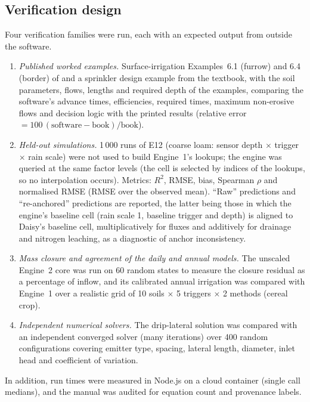 \documentclass[preprint,12pt]{elsarticle}
\begin{document}
\subsection{Verification design}
\label{sec:vermethods}
Four verification families were run, each with an expected output from outside the software.
\begin{enumerate}[nosep]
\item \emph{Published worked examples.} Surface-irrigation Examples~6.1 (furrow) and 6.4 (border) of \cite{Walker1987} and a sprinkler design example from the textbook, with the soil parameters, flows, lengths and required depth of the examples, comparing the software's advance times, efficiencies, required times, maximum non-erosive flows and decision logic with the printed results (relative error $=100\,(\mathrm{software}-\mathrm{book})/\mathrm{book}$).
\item \emph{Held-out simulations.} 1\,000 runs of E12 (coarse loam: sensor depth $\times$ trigger $\times$ rain scale) were not used to build Engine~1's lookups; the engine was queried at the same factor levels (the cell is selected by indices of the lookups, so no interpolation occurs). Metrics: $R^2$, RMSE, bias, Spearman $\rho$ and normalised RMSE (RMSE over the observed mean). ``Raw'' predictions and ``re-anchored'' predictions are reported, the latter being those in which the engine's baseline cell (rain scale 1, baseline trigger and depth) is aligned to Daisy's baseline cell, multiplicatively for fluxes and additively for drainage and nitrogen leaching, as a diagnostic of anchor inconsistency.
\item \emph{Mass closure and agreement of the daily and annual models.} The unscaled Engine~2 core was run on 60 random states to measure the closure residual as a percentage of inflow, and its calibrated annual irrigation was compared with Engine~1 over a realistic grid of 10 soils $\times$ 5 triggers $\times$ 2 methods (cereal crop).
\item \emph{Independent numerical solvers.} The drip-lateral solution was compared with an independent converged solver (many iterations) over 400 random configurations covering emitter type, spacing, lateral length, diameter, inlet head and coefficient of variation.
\end{enumerate}
In addition, run times were measured in Node.js on a cloud container (single call medians), and the manual was audited for equation count and provenance labels.

\end{document}
